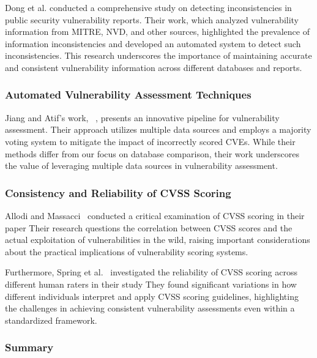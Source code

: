 \documentclass[12pt]{article}
\begin{document}
Dong et al.\@ \cite{dong} conducted a comprehensive study on detecting inconsistencies in public security
vulnerability reports. Their work, which analyzed vulnerability information from MITRE, NVD, and other
sources, highlighted the prevalence of information inconsistencies and developed an automated system
to detect such inconsistencies. This research underscores the importance of maintaining accurate and
consistent vulnerability information across different databases and reports.

\subsubsection{Automated Vulnerability Assessment Techniques}

Jiang and Atif's work, ~\cite{jiang}, presents an innovative pipeline for vulnerability assessment.
Their approach utilizes multiple data sources and employs a majority voting system to mitigate the
impact of incorrectly scored CVEs. While their methods differ from our focus on database comparison,
their work underscores the value of leveraging multiple data sources in vulnerability assessment.


\subsubsection{Consistency and Reliability of CVSS Scoring}

Allodi and Massacci~\cite{allodi} conducted a critical examination of CVSS scoring in their paper
 Their research questions
the correlation between CVSS scores and the actual exploitation of vulnerabilities in the wild,
raising important considerations about the practical implications of vulnerability scoring systems.

Furthermore, Spring et al.~\cite{improving_cvss} investigated the reliability of CVSS scoring across
different human raters in their study  They found significant variations in
how different individuals interpret and apply CVSS scoring guidelines, highlighting the challenges
in achieving consistent vulnerability assessments even within a standardized framework.

\subsubsection{Summary}
\end{document}
